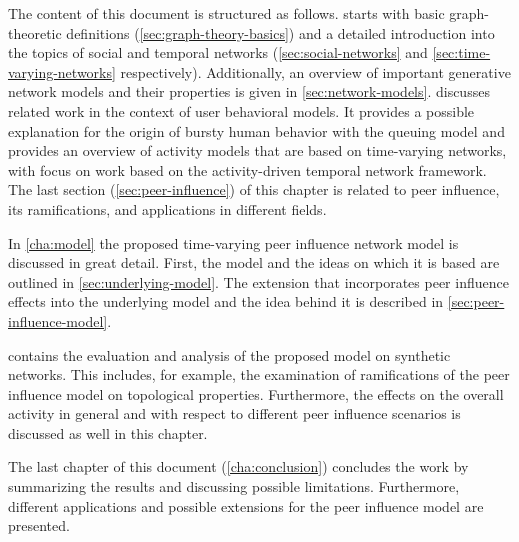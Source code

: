 The content of this document is structured as follows.
 starts with basic graph-theoretic definitions (\cref{sec:graph-theory-basics}) and a detailed introduction into the topics of social and temporal networks (\cref{sec:social-networks} and \cref{sec:time-varying-networks} respectively).
Additionally, an overview of important generative network models and their properties is given in \cref{sec:network-models}.
 discusses related work in the context of user behavioral models.
It provides a possible explanation for the origin of bursty human behavior with the queuing model and provides an overview of activity models that are based on time-varying networks, with focus on work based on the activity-driven temporal network framework.
The last section (\cref{sec:peer-influence}) of this chapter is related to peer influence, its ramifications, and applications in different fields.

In \cref{cha:model} the proposed time-varying peer influence network model is discussed in great detail.
First, the model and the ideas on which it is based are outlined in \cref{sec:underlying-model}.
The extension that incorporates peer influence effects into the underlying model and the idea behind it is described in \cref{sec:peer-influence-model}.

 contains the evaluation and analysis of the proposed model on synthetic networks.
This includes, for example, the examination of ramifications of the peer influence model on topological properties.
Furthermore, the effects on the overall activity in general and with respect to different peer influence scenarios is discussed as well in this chapter.

The last chapter of this document (\cref{cha:conclusion}) concludes the work
by summarizing the results and discussing possible limitations.
Furthermore, different applications and possible extensions for the peer influence model are presented.
